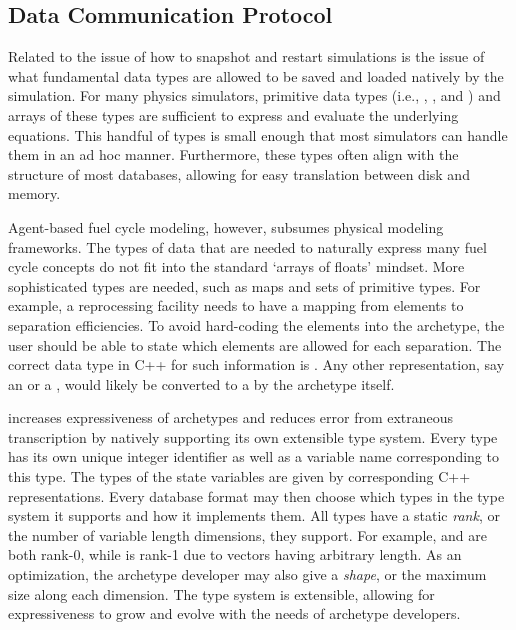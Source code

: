 \subsection{Data Communication Protocol}

Related to the issue of how to snapshot and restart simulations is the issue of 
what fundamental data types are allowed to be saved and loaded natively by the 
simulation. For many physics simulators, primitive data types (i.e., , 
, and ) and arrays of these types are sufficient to 
express and evaluate the underlying equations. This handful of types is small enough 
that most simulators can handle them in an ad hoc manner. Furthermore, these types
often align with the structure of most databases, allowing for easy translation
between disk and memory.

Agent-based fuel cycle modeling, however, subsumes physical modeling frameworks.
The types of data that are needed to naturally express many fuel cycle concepts 
do not fit into the standard `arrays of floats' mindset.  More sophisticated types are needed,
such as maps and sets of primitive types. For example, 
a reprocessing facility needs to have a mapping from elements to separation 
efficiencies. To avoid hard-coding the elements into the archetype, the user should 
be able to state which elements are allowed for each separation. The correct data
type in C++ for such information is . Any other 
representation, say an  or a ,  would likely be converted to 
a  by the archetype itself.

\Cyclus increases expressiveness of archetypes and reduces error from extraneous 
transcription by natively supporting its own extensible type system. Every type
has its own unique integer identifier as well as 
a variable name corresponding to this type. 
The types of the state variables are given by corresponding C++ representations.
Every database format may then choose which types in the type system it 
supports and how it implements them. All types have a static \emph{rank}, or the 
number of variable length dimensions, they support.  For example,  and 
 are both rank-0, while  is rank-1 due to 
vectors having arbitrary length. As an optimization, the archetype developer 
may also give a \emph{shape}, or the maximum size along each dimension. 
The type system is extensible, 
allowing for expressiveness to grow and evolve with the needs of archetype developers.


